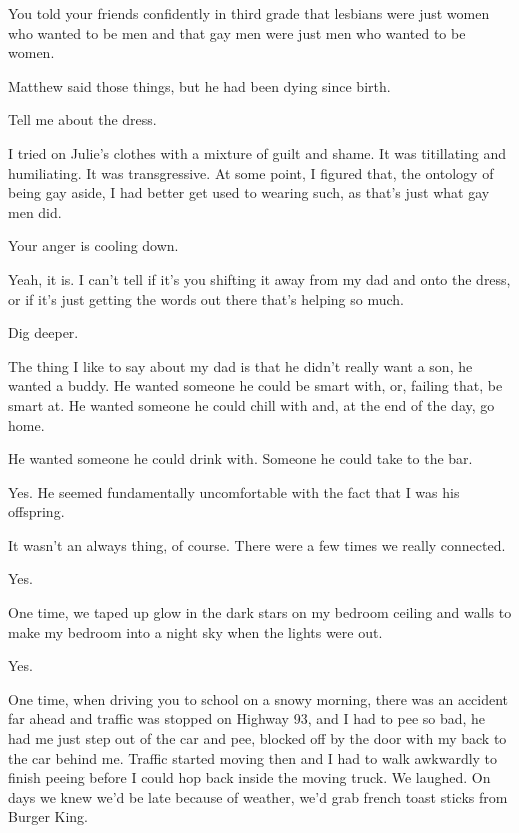 \begin{paracol}{2}
\begin{leftcolumn}
\begin{ally}
You told your friends confidently in third grade that lesbians were just women who wanted to be men and that gay men were just men who wanted to be women.
\end{ally}
Matthew said those things, but he had been dying since birth.

\begin{ally}
Tell me about the dress.
\end{ally}
I tried on Julie's clothes with a mixture of guilt and shame. It was titillating and humiliating. It was transgressive. At some point, I figured that, the ontology of being gay aside, I had better get used to wearing such, as that's just what gay men did.

\begin{ally}
Your anger is cooling down.
\end{ally}
Yeah, it is. I can't tell if it's you shifting it away from my dad and onto the dress, or if it's just getting the words out there that's helping so much.

\begin{ally}
Dig deeper.
\end{ally}
\newpage

The thing I like to say about my dad is that he didn't really want a son, he wanted a buddy. He wanted someone he could be smart with, or, failing that, be smart at. He wanted someone he could chill with and, at the end of the day, go home.

\begin{ally}
He wanted someone he could drink with. Someone he could take to the bar.
\end{ally}
Yes. He seemed fundamentally uncomfortable with the fact that I was his offspring.

It wasn't an always thing, of course. There were a few times we really connected.

\begin{ally}
Yes.
\end{ally}
One time, we taped up glow in the dark stars on my bedroom ceiling and walls to make my bedroom into a night sky when the lights were out.

\begin{ally}
Yes.
\end{ally}
One time, when driving you to school on a snowy morning, there was an accident far ahead and traffic was stopped on Highway 93, and I had to pee so bad, he had me just step out of the car and pee, blocked off by the door with my back to the car behind me. Traffic started moving then and I had to walk awkwardly to finish peeing before I could hop back inside the moving truck. We laughed. On days we knew we'd be late because of weather, we'd grab french toast sticks from Burger King.


\end{leftcolumn}
\end{paracol}
